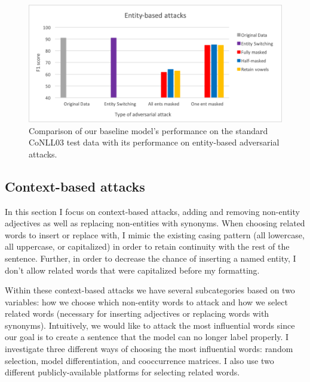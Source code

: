 \begin{figure}[h]
	\centering
	\includegraphics[width=0.85\linewidth]{LatexDiss/figures/entityattacks.png}
	\caption{Comparison of our baseline model's performance on the standard CoNLL03 test data with its performance on entity-based adversarial attacks.}
	\label{fig:entityattacksresults}
\end{figure}
 
 
\subsection{Context-based attacks}
In this section I focus on context-based attacks, adding and removing non-entity adjectives as well as replacing non-entities with synonyms. When choosing related words to insert or replace with, I mimic the existing casing pattern (all lowercase, all uppercase, or capitalized) in order to retain continuity with the rest of the sentence. Further, in order to decrease the chance of inserting a named entity, I don't allow related words that were capitalized before my formatting.

Within these context-based attacks we have several subcategories based on two variables: how we choose which non-entity words to attack and how we select related words (necessary for inserting adjectives or replacing words with synonyms). Intuitively, we would like to attack the most influential words since our goal is to create a sentence that the model can no longer label properly. I investigate three different ways of choosing the most influential words: random selection, model differentiation, and cooccurrence matrices. I also use two different publicly-available platforms for selecting related words.

